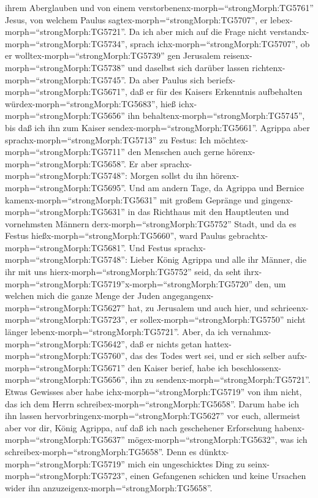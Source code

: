 ihrem Aberglauben und von einem
verstorbenenx-morph=``strongMorph:TG5761'' Jesus, von welchem Paulus
sagtex-morph=``strongMorph:TG5707'', er
lebex-morph=``strongMorph:TG5721''.  Da ich aber mich auf
die Frage nicht verstandx-morph=``strongMorph:TG5734'', sprach
ichx-morph=``strongMorph:TG5707'', ob er
wolltex-morph=``strongMorph:TG5739'' gen Jerusalem
reisenx-morph=``strongMorph:TG5738'' und daselbst sich darüber lassen
richtenx-morph=``strongMorph:TG5745''.  Da aber Paulus sich
beriefx-morph=``strongMorph:TG5671'', daß er für des Kaisers Erkenntnis
aufbehalten würdex-morph=``strongMorph:TG5683'', hieß
ichx-morph=``strongMorph:TG5656'' ihn
behaltenx-morph=``strongMorph:TG5745'', bis daß ich ihn zum Kaiser
sendex-morph=``strongMorph:TG5661''.  Agrippa aber
sprachx-morph=``strongMorph:TG5713'' zu Festus: Ich
möchtex-morph=``strongMorph:TG5711'' den Menschen auch gerne
hörenx-morph=``strongMorph:TG5658''. Er aber
sprachx-morph=``strongMorph:TG5748'': Morgen sollst du ihn
hörenx-morph=``strongMorph:TG5695''.  Und am andern Tage,
da Agrippa und Bernice kamenx-morph=``strongMorph:TG5631'' mit großem
Gepränge und gingenx-morph=``strongMorph:TG5631'' in das Richthaus mit
den Hauptleuten und vornehmsten Männern
derx-morph=``strongMorph:TG5752'' Stadt, und da es Festus
hießx-morph=``strongMorph:TG5660'', ward Paulus
gebrachtx-morph=``strongMorph:TG5681''.  Und Festus
sprachx-morph=``strongMorph:TG5748'': Lieber König Agrippa und alle ihr
Männer, die ihr mit uns hierx-morph=``strongMorph:TG5752'' seid, da seht
ihrx-morph=``strongMorph:TG5719''\textbar x-morph=``strongMorph:TG5720''
den, um welchen mich die ganze Menge der Juden
angegangenx-morph=``strongMorph:TG5627'' hat, zu Jerusalem und auch
hier, und schrieenx-morph=``strongMorph:TG5723'', er
sollex-morph=``strongMorph:TG5750'' nicht länger
lebenx-morph=``strongMorph:TG5721''.  Aber, da ich
vernahmx-morph=``strongMorph:TG5642'', daß er nichts getan
hattex-morph=``strongMorph:TG5760'', das des Todes wert sei, und er sich
selber aufx-morph=``strongMorph:TG5671'' den Kaiser berief, habe ich
beschlossenx-morph=``strongMorph:TG5656'', ihn zu
sendenx-morph=``strongMorph:TG5721''.  Etwas Gewisses aber
habe ichx-morph=``strongMorph:TG5719'' von ihm nicht, das ich dem Herrn
schreibex-morph=``strongMorph:TG5658''. Darum habe ich ihn lassen
hervorbringenx-morph=``strongMorph:TG5627'' vor euch, allermeist aber
vor dir, König Agrippa, auf daß ich nach geschehener Erforschung
habenx-morph=``strongMorph:TG5637'' mögex-morph=``strongMorph:TG5632'',
was ich schreibex-morph=``strongMorph:TG5658''.  Denn es
dünktx-morph=``strongMorph:TG5719'' mich ein ungeschicktes Ding zu
seinx-morph=``strongMorph:TG5723'', einen Gefangenen schicken und keine
Ursachen wider ihn anzuzeigenx-morph=``strongMorph:TG5658''.


